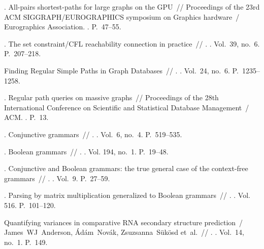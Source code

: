 \begin{thebibliography}{10}
. All-pairs shortest-paths for large
  graphs on the GPU~// Proceedings of the 23rd ACM SIGGRAPH/EUROGRAPHICS
  symposium on Graphics hardware~/ Eurographics Association. \BibDash
{}. \BibDash
\newblock P.~47--55.

. The set constraint/CFL reachability
  connection in practice~// . \BibDash
{}. \BibDash
\newblock Vol.~39, no.~6. \BibDash
\newblock P.~207--218.

 Finding Regular Simple Paths in Graph
  Databases~// . \BibDash
{}. \BibDash
\newblock Vol.~24, no.~6. \BibDash
\newblock P.~1235--1258.

. Regular path queries on massive
  graphs~// Proceedings of the 28th International Conference on Scientific and
  Statistical Database Management~/ ACM. \BibDash
{}. \BibDash
\newblock P.~13.

. Conjunctive grammars~// . \BibDash
{}. \BibDash
\newblock Vol.~6, no.~4. \BibDash
\newblock P.~519--535.

. Boolean grammars~// . \BibDash
{}. \BibDash
\newblock Vol. 194, no.~1. \BibDash
\newblock P.~19--48.

. Conjunctive and Boolean grammars: the true general
  case of the context-free grammars~// .
  \BibDash
{}. \BibDash
\newblock Vol.~9. \BibDash
\newblock P.~27--59.

. Parsing by matrix multiplication generalized to
  Boolean grammars~// . \BibDash
{}. \BibDash
\newblock Vol. 516. \BibDash
\newblock P.~101--120.

Quantifying variances in comparative RNA secondary structure prediction~/
  James~WJ~Anderson, {\'A}d{\'a}m~Nov{\'a}k, Zsuzsanna~S{\"u}k{\"o}sd et~al.~//
  . \BibDash
{}. \BibDash
\newblock Vol.~14, no.~1. \BibDash
\newblock P.~149.


\end{thebibliography}
